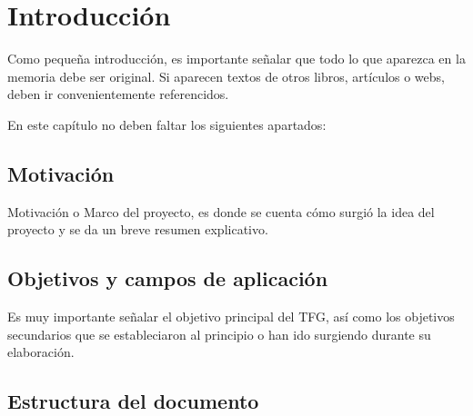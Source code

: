 \chapter{Introducción}

Como pequeña introducción, es importante señalar que todo lo que aparezca en la memoria debe ser original. Si aparecen textos de otros libros, artículos o webs, deben ir convenientemente referencidos.

En este capítulo no deben faltar los siguientes apartados:

\section{Motivación}

Motivación o Marco del proyecto, es donde se cuenta cómo surgió la idea del proyecto y se da un breve resumen explicativo.

\section{Objetivos y campos de aplicación}

Es muy importante señalar el objetivo principal del TFG, así como los objetivos secundarios que se estableciaron al principio o han ido surgiendo durante su elaboración.

\section{Estructura del documento}

